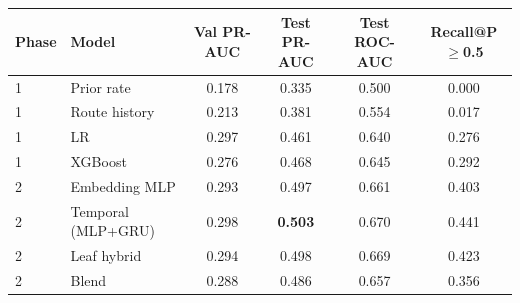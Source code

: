 \begin{tabular}{llcccc}
\toprule
Phase & Model & Val PR-AUC & Test PR-AUC & Test ROC-AUC & Recall@P$\geq$0.5 \\
\midrule
1 & Prior rate & 0.178 & 0.335 & 0.500 & 0.000 \\
1 & Route history & 0.213 & 0.381 & 0.554 & 0.017 \\
1 & LR & 0.297 & 0.461 & 0.640 & 0.276 \\
1 & XGBoost & 0.276 & 0.468 & 0.645 & 0.292 \\
\midrule
2 & Embedding MLP & 0.293 & 0.497 & 0.661 & 0.403 \\
2 & Temporal (MLP+GRU) & 0.298 & \textbf{0.503} & 0.670 & 0.441 \\
2 & Leaf hybrid & 0.294 & 0.498 & 0.669 & 0.423 \\
2 & Blend & 0.288 & 0.486 & 0.657 & 0.356 \\
\bottomrule
\end{tabular}
